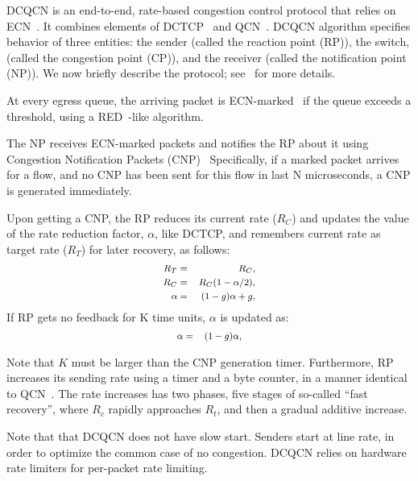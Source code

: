 DCQCN is an end-to-end, rate-based congestion control protocol that relies on
ECN~\cite{ecn}. It combines elements of DCTCP~\cite{dctcp} and QCN~\cite{qcn}.
DCQCN algorithm specifies behavior of three entities: the sender (called the
reaction point (RP)), the switch, (called the congestion point (CP)), and the
receiver (called the notification point (NP)). We now briefly describe the
protocol; see~\cite{dcqcn} for more details.

 At every egress queue, the arriving packet is
ECN-marked~\cite{ecn} if the queue exceeds a threshold, using a
RED~\cite{red}-like algorithm.

 The NP receives ECN-marked packets and notifies the RP about
it using Congestion Notification Packets (CNP)~\cite{rocev2} Specifically, if a
marked packet arrives for a flow, and no CNP has been sent for this flow in last
N microseconds, a CNP is generated immediately.

 Upon getting a CNP, the RP reduces its current rate ($R_C$)
and updates the value of the rate reduction factor, $\alpha$, like DCTCP, and
remembers current rate as target rate ($R_T$) for later recovery, as follows:
\begin{equation} 
\small 
\begin{aligned} 
R_T &=& R_C,	\\ 
R_C &=& R_C (1 -\alpha/2),  \\ 
\alpha &=& (1-g)\alpha + g, 
\end{aligned} 
\label{eq:rp_dec}
\end{equation} 
If RP gets no feedback for K time units, $\alpha$ is updated as:
\begin{equation} 
\small 
\begin{aligned} 
\alpha &=& (1-g)\alpha, 
\end{aligned}
\label{eq:rp_alpha_recover} 
\end{equation}

Note that $K$ must be larger than the CNP generation timer. Furthermore, RP
increases its sending rate using a timer and a byte counter, in a manner
identical to QCN~\cite{qcn}. The rate increases has two phases, five stages of
so-called ``fast recovery'', where $R_c$ rapidly approaches $R_t$, and then a
gradual additive increase.

Note that that DCQCN does not have slow start. Senders start at line rate, in
order to optimize the common case of no congestion. DCQCN relies on hardware
rate limiters for per-packet rate limiting. 
